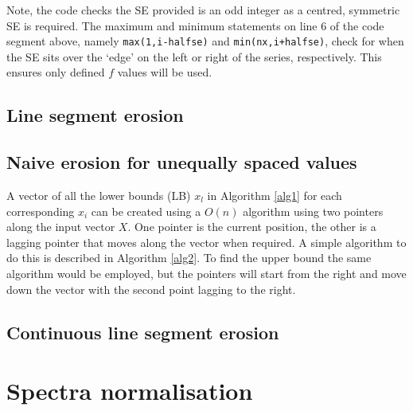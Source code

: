 \documentclass[12pt,a4paper,oneside]{report}
\begin{document}
\begin{appendix}
	

\vskip12pt


Note, the code checks the SE provided is an odd integer as a centred, symmetric SE is required. The maximum and minimum statements on line 6 of the code segment above, namely {\tt max(1,i-halfse)} and {\tt min(nx,i+halfse)}, check for when the SE sits over the `edge' on the left or right of the series, respectively. This ensures only defined $f$ values will be used. 
	
\clearpage	
	
\subsection{Line segment erosion} 


	

\clearpage
		
\subsection{Naive erosion for unequally spaced values}


A vector of all the lower bounds (LB) $x_l$ in Algorithm \ref{alg1} for each corresponding $x_i$ can be created using a $O (n)$ algorithm using two pointers along the input vector $X$. One pointer is the current position, the other is a lagging pointer that moves along the vector when required. A simple algorithm to do this is described in Algorithm \ref{alg2}. To find the upper bound the same algorithm would be employed, but the pointers will start from the right and move down the vector with the second point lagging to the right.\\[15pt]


	


	\clearpage



\subsection{Continuous line segment erosion} 


	






\clearpage


\section{Spectra normalisation}


\end{appendix}
\end{document}
